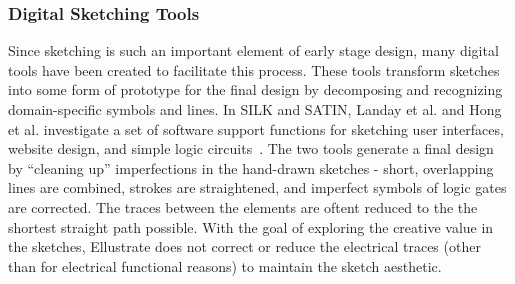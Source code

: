 \documentclass{sigchi}
\begin{document}



\subsubsection{Digital Sketching Tools} 
Since sketching is such an important element of early stage design, many digital tools have been created to facilitate this process. These tools transform sketches into some form of prototype for the final design by decomposing and recognizing domain-specific symbols and lines. In SILK and SATIN, Landay et al. and Hong et al. investigate a set of software support functions for sketching user interfaces, website design, and simple logic circuits~\cite{Hong:2007ta,Landay:1996wn}. The two tools generate a final design by ``cleaning up'' imperfections in the hand-drawn sketches - short, overlapping lines are combined, strokes are straightened, and imperfect symbols of logic gates are corrected. The traces between the elements are oftent reduced to the the shortest straight path possible. With the goal of exploring the creative value in the sketches, Ellustrate does not correct or reduce the electrical traces (other than for electrical functional reasons) to maintain the sketch aesthetic. 
\end{document}
